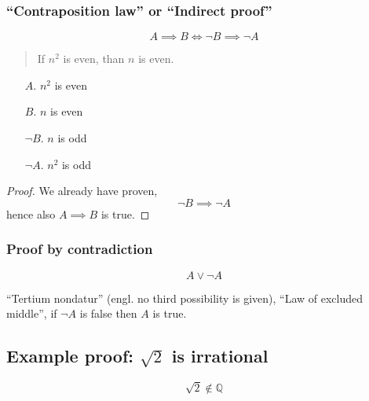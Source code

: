 \documentclass[a4paper,landscape,twocolumn]{article}
\begin{document}
\subsubsection{\enquote{Contraposition law} or \enquote{Indirect proof}}
%
\[ A \implies B \iff \neg B \implies \neg A \]
%
\begin{quote}
  If $n^2$ is even, than $n$ is even.
\end{quote}
%
\begin{itemize}
  \item[$A$.] $n^2$ is even
  \item[$B$.] $n$ is even
  \item[$\neg B$.] $n$ is odd
  \item[$\neg A$.] $n^2$ is odd
\end{itemize}

\begin{proof}
We already have proven,
\[ \neg B \implies \neg A \]
hence also $A \implies B$ is true.
\end{proof}

\subsubsection{Proof by contradiction}
\[ A \lor \neg A \]

\enquote{Tertium nondatur} (engl. no third possibility is given), \enquote{Law of excluded middle},
if $\neg A$ is false then $A$ is true.

\subsection{Example proof: $\sqrt{2}$ is irrational}
%
\[ \sqrt{2} \not\in \mathbb{Q} \]
\end{document}
